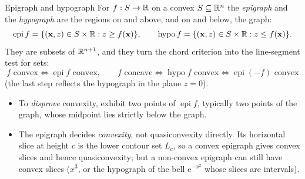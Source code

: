 \begin{rulebox}{Epigraph and hypograph}
For $f:S\to\mathbb{R}$ on a convex $S\subseteq\mathbb{R}^{n}$ the \emph{epigraph}
 and the \emph{hypograph}  are the regions on and
above, and on and below, the graph:
\[
  \operatorname{epi}f=\{(\mathbf{x},z)\in S\times\mathbb{R}: z\ge f(\mathbf{x})\},
  \qquad
  \operatorname{hypo}f=\{(\mathbf{x},z)\in S\times\mathbb{R}: z\le f(\mathbf{x})\}.
\]
They are subsets of $\mathbb{R}^{n+1}$, and they turn the chord criterion into the
line-segment test for sets:
\[
  f \text{ convex} \iff \operatorname{epi}f \text{ convex},
  \qquad
  f \text{ concave} \iff \operatorname{hypo}f \text{ convex}
  \iff \operatorname{epi}(-f) \text{ convex}
\]
(the last step reflects the hypograph in the plane $z=0$).
\begin{itemize}[leftmargin=1.6em,itemsep=0.3ex]
  \item To \emph{disprove} convexity, exhibit two points of
        $\operatorname{epi}f$, typically two points of the graph, whose
        midpoint lies strictly below the graph.
  \item The epigraph decides \emph{convexity}, not quasiconvexity directly.
        Its horizontal slice at height $c$ is the lower contour set
        $L_c$, so a convex epigraph gives convex slices and hence
        quasiconvexity; but a non-convex epigraph can still have convex
        slices ($x^{3}$, or the hypograph of the bell
        $\mathrm{e}^{-x^{2}}$ whose slices are intervals).
\end{itemize}
\end{rulebox}

